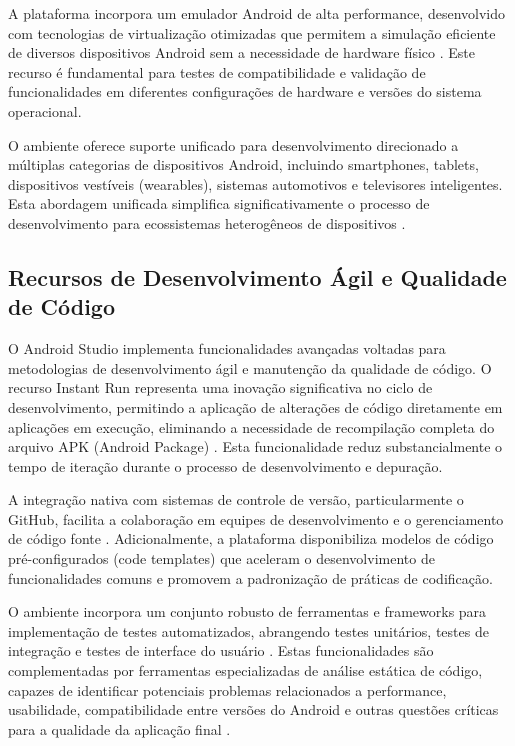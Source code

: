 A plataforma incorpora um emulador Android de alta performance, desenvolvido com tecnologias de virtualização otimizadas que permitem a simulação eficiente de diversos dispositivos Android sem a necessidade de hardware físico \cite{google2023emulator}. Este recurso é fundamental para testes de compatibilidade e validação de funcionalidades em diferentes configurações de hardware e versões do sistema operacional.

O ambiente oferece suporte unificado para desenvolvimento direcionado a múltiplas categorias de dispositivos Android, incluindo smartphones, tablets, dispositivos vestíveis (wearables), sistemas automotivos e televisores inteligentes. Esta abordagem unificada simplifica significativamente o processo de desenvolvimento para ecossistemas heterogêneos de dispositivos \cite{ableson2023multiplatform}.

\subsection{Recursos de Desenvolvimento Ágil e Qualidade de Código}

O Android Studio implementa funcionalidades avançadas voltadas para metodologias de desenvolvimento ágil e manutenção da qualidade de código. O recurso Instant Run representa uma inovação significativa no ciclo de desenvolvimento, permitindo a aplicação de alterações de código diretamente em aplicações em execução, eliminando a necessidade de recompilação completa do arquivo APK (Android Package) \cite{google2022instantrun}. Esta funcionalidade reduz substancialmente o tempo de iteração durante o processo de desenvolvimento e depuração.

A integração nativa com sistemas de controle de versão, particularmente o GitHub, facilita a colaboração em equipes de desenvolvimento e o gerenciamento de código fonte \cite{github2023integration}. Adicionalmente, a plataforma disponibiliza modelos de código pré-configurados (code templates) que aceleram o desenvolvimento de funcionalidades comuns e promovem a padronização de práticas de codificação.

O ambiente incorpora um conjunto robusto de ferramentas e frameworks para implementação de testes automatizados, abrangendo testes unitários, testes de integração e testes de interface do usuário \cite{junit2023android}. Estas funcionalidades são complementadas por ferramentas especializadas de análise estática de código, capazes de identificar potenciais problemas relacionados a performance, usabilidade, compatibilidade entre versões do Android e outras questões críticas para a qualidade da aplicação final \cite{android2023lint}.

